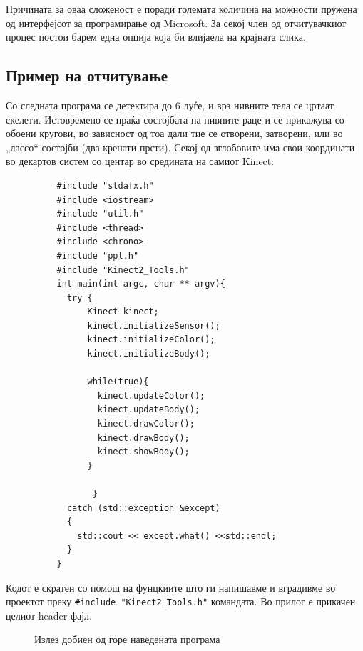 \documentclass[12pt]{article}
\begin{document}
  Причината за оваа сложеност е поради големата количина на можности пружена од интерфејсот за програмирање од Microsoft. За секој член од отчитувачкиот процес постои барем една опција која би влијаела на крајната слика.

  \subsection{Пример на отчитување}
    Со следната програма се детектира до 6 луѓе, и врз нивните тела се цртаат скелети. Истовремено се праќа состојбата на нивните раце и се прикажува со обоени кругови, во зависност од тоа дали тие се отворени, затворени, или во „лассо“ состојби (два кренати прсти). Секој од зглобовите има свои координати во декартов систем со центар во средината на самиот Kinect:
      \begin{verbatim}
          #include "stdafx.h"
          #include <iostream>
          #include "util.h"
          #include <thread>
          #include <chrono>
          #include "ppl.h"
          #include "Kinect2_Tools.h"
          int main(int argc, char ** argv){
            try {
                Kinect kinect;
                kinect.initializeSensor();
                kinect.initializeColor();
                kinect.initializeBody();

                while(true){
                  kinect.updateColor();
                  kinect.updateBody();
                  kinect.drawColor();
                  kinect.drawBody();
                  kinect.showBody();
                }

                 }
            catch (std::exception &except)
            {
              std::cout << except.what() <<std::endl;
            }
          }
        \end{verbatim}

    Кодот е скратен со помош на фунцкиите што ги напишавме и вградивме во проектот преку \verb|#include "Kinect2_Tools.h"| командата. Во прилог е прикачен целиот header фајл.

    \begin{figure}[H]
      \centering
      \caption{Излез добиен од горе наведената програма}
      \label{fig:an-image-that-doesnt-exist-yet.png}
      \end{figure}

\newpage
\end{document}
